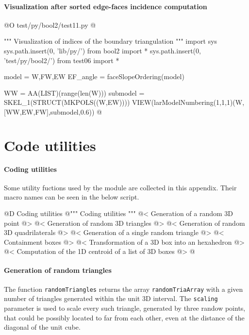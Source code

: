 \documentclass[11pt,oneside]{article}    %
\begin{document}
\paragraph{Visualization after sorted edge-faces incidence computation}

@O test/py/bool2/test11.py @{
""" Visualization of indices of the boundary triangulation """
import sys
sys.path.insert(0, 'lib/py/')
from bool2 import *
sys.path.insert(0, 'test/py/bool2/')
from test06 import *

model = W,FW,EW
EF_angle = faceSlopeOrdering(model)

WW = AA(LIST)(range(len(W)))
submodel = SKEL_1(STRUCT(MKPOLS((W,EW))))
VIEW(larModelNumbering(1,1,1)(W,[WW,EW,FW],submodel,0.6))
@}




\appendix
\section{Code utilities}

\paragraph{Coding utilities}

Some utility fuctions used by the module are collected in this appendix. Their macro names can be seen in the below script.

@D Coding utilities
@{""" Coding utilities """
@< Generation of a random 3D point @>
@< Generation of random 3D triangles @>
@< Generation of random 3D quadrilaterals @>
@< Generation of a single random triangle @>
@< Containment boxes @>
@< Transformation of a 3D box into an hexahedron @>
@< Computation of the 1D centroid of a list of 3D boxes @>
@}


\paragraph{Generation of random triangles}
The function \texttt{randomTriangles} returns the array \texttt{randomTriaArray} with a given number of triangles generated within the unit 3D interval. The \texttt{scaling} parameter is used to scale every such triangle, generated by three randow points, that could be possibly located to far from each other, even at the distance of the diagonal of the unit cube.
\end{document}
